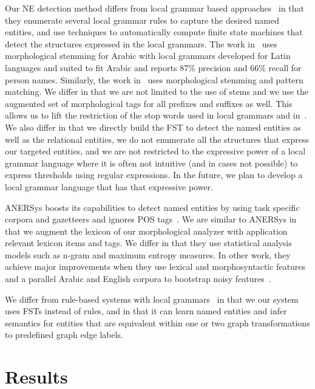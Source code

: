 \documentclass{llncs}
\begin{document}
Our NE detection method differs from 
local grammar based approaches~\cite{ZAGHOUANI10,Traboulsi:09}
in that they enumerate several local grammar rules
to capture the desired named entities, 
and use techniques to automatically compute finite state 
machines that detect the structures expressed in the 
local grammars.
The work in~\cite{ZAGHOUANI10} uses morphological stemming
for Arabic with local grammars developed for Latin languages 
and suited to fit Arabic and reports 87\% precision and 
66\% recall for person names. 
Similarly, the work in~\cite{jumaily2011,TAGARAB98} 
uses morphological stemming and pattern matching. 
We differ in that we are not limited to the use of stems 
and we use the augmented
set of morphological tags for all prefixes and suffixes as well.
This allows us to lift the restriction of the stop words 
used in local grammars and in~\cite{Abuleil04}.
We also differ in that we directly build the
FST to detect the named entities as well 
as the relational entities, 
we do not enumerate all the structures that express our targeted
entities, and we are not restricted to the expressive power of 
a local grammar language where it is often not intuitive 
(and in cases not possible) to express thresholds using regular 
expressions. 
In the future, we plan to develop a local
grammar language that has that expressive power.

ANERSys boosts its capabilities to detect named entities by using 
task specific corpora and gazetteers and ignores 
POS tags~\cite{ANERSys:07,BenajibaDR08}. 
We are similar to ANERSys in that we augment the lexicon of our
morphological analyzer with application relevant lexicon items
and tags. 
We differ in that they use statistical analysis models such as
n-gram and maximum entropy measures.
In other work, they
achieve major improvements when they use lexical and
morphosyntactic features and a parallel Arabic and English 
corpora to bootstrap noisy features~\cite{BenajibaZDR10}. 

We differ from rule-based systems with local 
grammars~\cite{ShaalanR09} in that we our system 
uses FSTs instead of rules, and in that it can learn named 
entities and infer semantics
for entities that are equivalent within one or two graph 
transformations to predefined graph edge labels. 


\section{Results}
\label{sec:results}
\end{document}
